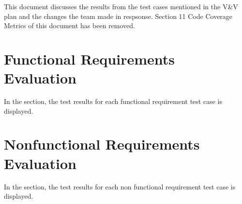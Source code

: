 \documentclass[12pt, titlepage]{article}
\begin{document}

\newpage

\tableofcontents

\listoftables %

\listoffigures %

\newpage


This document discusses the results from the test cases mentioned in the V\&V plan and the changes the team made in respsonse. 
Section 11 Code Coverage Metrics of this document has been removed.

\section{Functional Requirements Evaluation}

In the section, the test results for each functional requirement test case is displayed.

\pagebreak
\section{Nonfunctional Requirements Evaluation}

In the section, the test results for each non functional requirement test case is displayed.
\end{document}
